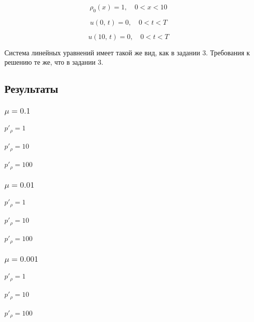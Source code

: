 \documentclass[12pt]{article}
\begin{document}
$$
\rho_0(x) = 1{,}\quad 0 < x < 10
$$

$$
u(0{,}\, t) = 0{,}\quad 0 < t < T 
$$

$$
u(10{,}\, t) = 0{,}\quad 0 < t < T 
$$

Система линейных уравнений имеет такой же вид, как в задании 3. Требования к решению те же, что в задании 3.

\subsection{Результаты}

\subsubsection{$\mu = 0.1$}
\paragraph{$p'_{\rho} = 1$}
\paragraph{$p'_{\rho} = 10$}
\paragraph{$p'_{\rho} = 100$}
\subsubsection{$\mu = 0.01$}
\paragraph{$p'_{\rho} = 1$}
\paragraph{$p'_{\rho} = 10$}
\paragraph{$p'_{\rho} = 100$}
\subsubsection{$\mu = 0.001$}
\paragraph{$p'_{\rho} = 1$}
\paragraph{$p'_{\rho} = 10$}
\paragraph{$p'_{\rho} = 100$}
\end{document}
